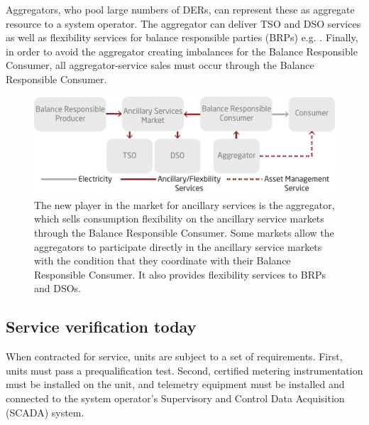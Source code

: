 Aggregators, who pool large numbers of DERs, can represent these as aggregate resource to a system operator. 
The aggregator can deliver TSO and DSO services as well as flexibility services for balance responsible parties (BRPs) e.g. \cite{tougaard2015flech,usef2015}.  
Finally, in order to avoid the aggregator creating imbalances for the Balance Responsible Consumer, all aggregator-service sales must occur through the Balance Responsible Consumer. 
\begin{figure}
  \centering
  \includegraphics[width=\columnwidth]{graphics/tsg/market_future4}
  \caption{The new player in the market for ancillary services is the aggregator, which sells consumption flexibility on the ancillary service markets through the Balance Responsible Consumer. Some markets allow the aggregators to participate directly in the ancillary service markets with the condition that they coordinate with their Balance Responsible Consumer. It also provides flexibility services to BRPs and DSOs.}
  \label{fig:TSGmarket}
\end{figure}

\subsection{Service verification today}
When contracted for service, units are subject to a set of requirements. First, units must pass a prequalification test.%
Second, certified metering instrumentation must be installed on the unit, and telemetry equipment must be installed and connected to the system operator's Supervisory and Control Data Acquisition (SCADA) system.

